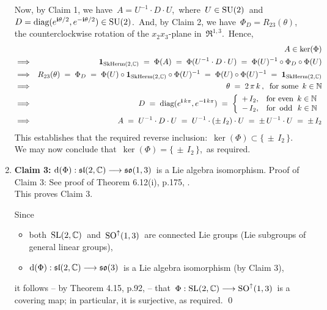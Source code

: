 \begin{enumerate}
	\vskip 0.3cm
	\noindent
	Now, by Claim 1, we have
	\,$A = U^{-1} \cdot D \cdot U$,\,
	where
	\,$U \in \textnormal{SU}(2)$\,
	and
	\,$D  = \textnormal{diag}(e^{\textnormal{\bf i}\theta/2},e^{-\textnormal{\bf i}\theta/2}) \in \textnormal{SU}(2)$.\,
	And, by Claim 2, we have
	\,$\Phi_{D} = R_{23}(\theta)$,\,
	the counterclockwise rotation of the
	$x_{2}x_{3}$-plane in \,$\Re^{1,3}$.\,
	Hence,
	\begin{eqnarray*}
	&&
		A \in \ker(\Phi)
	\\
	& \Longrightarrow &
		\mathbf{1}_{\textnormal{SkHerm}(2,\mathbb{C})}
		\; = \;
			\Phi(A)
		\; = \;
			\Phi(U^{-1} \cdot D \cdot U)
		\; = \;
			\Phi(U)^{-1} \circ \Phi_{D} \circ \Phi(U)
	\\
	& \Longrightarrow &
		R_{23}(\theta)
		\; = \;
			\Phi_{D}
		\; = \;
			\Phi(U) \circ \mathbf{1}_{\textnormal{SkHerm}(2,\mathbb{C})} \circ \Phi(U)^{-1}
		\; = \;
			\Phi(U) \circ \Phi(U)^{-1}
		\; = \;
			\mathbf{1}_{\textnormal{SkHerm}(2,\mathbb{C})}
	\\
	& \Longrightarrow &
		\theta
		\; = \;
			2\,\pi\,k\,,
		\;\;\textnormal{for some \,$k \in \mathbb{N}$}
	\\
	& \Longrightarrow &
		D
		\; = \;
			\textnormal{diag}(e^{\textnormal{\bf i}\,k\pi},e^{-\textnormal{\bf i}\,k\pi})
		\; = \;
			\left\{\begin{array}{cl}
				+\,I_{2}, & \textnormal{for even \,$k \in \mathbb{N}$}
				\\
				-\,I_{2}, & \textnormal{for \,odd\, \,$k \in \mathbb{N}$}
				\end{array}\right.
	\\
	& \Longrightarrow &
		A
		\; = \;
			U^{-1} \cdot D \cdot U
		\; = \;
			U^{-1} \cdot (\pm\,I_{2}) \cdot U
		\; = \;
			\pm \, U^{-1} \cdot U
		\; = \;
			\pm\,I_{2}
	\end{eqnarray*}
	This establishes that the required reverse inclusion: \,$\ker(\Phi) \subset \{\,\pm\,I_{2}\,\}$.\,
	We may now conclude that \,$\ker(\Phi) = \{\,\pm\,I_{2}\,\}$,\, as required.
\item
	\noindent
	\textbf{Claim 3:}\quad
	$\textnormal{d}(\Phi) : \mathfrak{sl}(2,\mathbb{C}) \longrightarrow \mathfrak{so}(1,3)$\,
	is a Lie algebra isomorphism.
	\vskip -0.01cm
	\noindent
	Proof of Claim 3:\;\;
	See proof of Theorem 6.12(i), p.175, \cite{Baker2002}.\\
	This proves Claim 3.

	\vskip 0.2cm
	\noindent
	Since
	\begin{itemize}
	\item
		both \,$\textnormal{SL}(2,\mathbb{C})$\, and \,$\textnormal{SO}^{\uparrow}(1,3)$\, are connected Lie groups (Lie subgroups of general linear groups),
	\item
		$\textnormal{d}(\Phi) : \mathfrak{sl}(2,\mathbb{C}) \longrightarrow \mathfrak{so}(3)$\,
		is a Lie algebra isomorphism (by Claim 3),
	\end{itemize}
	it follows -- by Theorem 4.15, p.92, \cite{Sepanski2010} -- that
	\,$\Phi : \textnormal{SL}(2,\mathbb{C}) \longrightarrow \textnormal{SO}^{\uparrow}(1,3)$\,
	is a covering map; in particular, it is surjective, as required.
	\qed
\end{enumerate}


